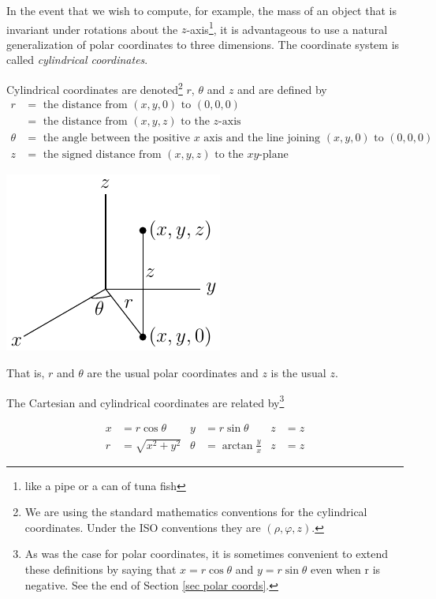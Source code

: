In the event that we wish to compute, for example, the mass
of an object that is invariant under rotations about the 
$z$-axis\footnote{like a pipe or a can of tuna fish},
it is advantageous to use a natural generalization of polar coordinates
to three dimensions. The coordinate system is called \emph{cylindrical
coordinates}. 
\begin{defn}\label{def cylindrical}
Cylindrical coordinates are denoted\footnote{We are using the 
standard mathematics conventions for the cylindrical coordinates.
Under the ISO conventions they are $(\rho,\varphi,z)$.} 
$r$, $\theta$ and $z$ and are defined by
\begin{align*}
r&=\text{ the distance from }(x,y,0)\text{ to }(0,0,0)\\
 &=\text{ the distance from }(x,y,z)\text{ to the $z$-axis}\\
\theta&=\text{ the angle between the positive $x$ axis and the 
            line joining $(x,y,0)$ to $(0,0,0)$}\\
z&=\text{ the signed distance from }(x,y,z)
\text{ to the $xy$-plane}
\end{align*}
\begin{efig}
\begin{center}
    \includegraphics{figures/coord/cyl1.pdf}
\end{center}
\end{efig}
That is, $r$ and $\theta$ are the usual polar coordinates and $z$ is the
usual $z$.
\end{defn}
 The Cartesian and cylindrical coordinates
are related by\footnote{As was the case for polar coordinates, it is 
sometimes convenient to extend these definitions by saying that 
$x = r\cos\theta$ and $y = r\sin\theta$ even when r is negative. See the end of Section \ref{sec polar coords}.}
\begin{impeqn}\label{eqn cylindrical}
\begin{align*}
x&=r\cos\theta &
y&=r\sin\theta &
z&=z \\
    r&=\sqrt{x^2+y^2} &
    \theta&=\arctan\frac{y}{x} &
    z&=z
\end{align*}
\end{impeqn}
